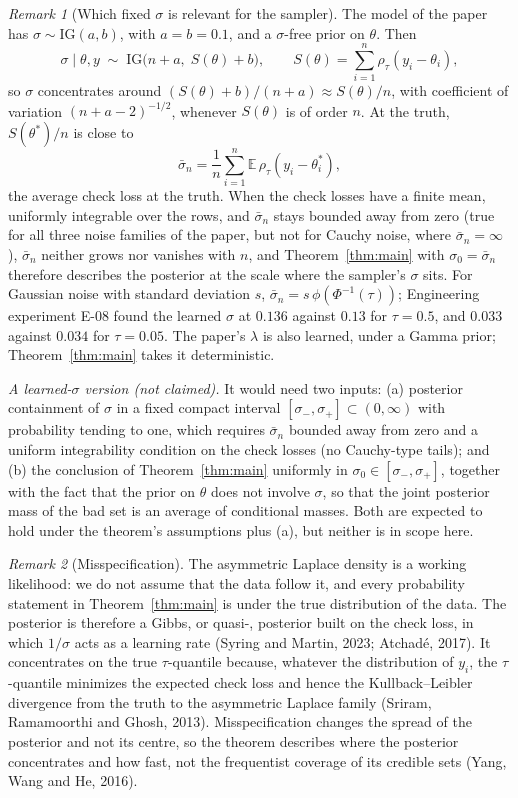 \documentclass[11pt]{article}
\theoremstyle{definition}
\theoremstyle{remark}
\newtheorem{remark}{Remark}
\newcommand{\E}{\mathbb{E}}
\newcommand{\thetas}{\theta^{*}}
\begin{document}
\begin{remark}[Which fixed $\sigma$ is relevant for the sampler]\label{rem:sampler}
The model of the paper has $\sigma\sim\mathrm{IG}(a,b)$, with $a=b=0.1$, and a $\sigma$-free prior on $\theta$. Then
\[
\sigma\mid\theta,y\;\sim\;\mathrm{IG}\bigl(n+a,\;S(\theta)+b\bigr),\qquad S(\theta)=\sum_{i=1}^n\rho_\tau(y_i-\theta_i),
\]
so $\sigma$ concentrates around $(S(\theta)+b)/(n+a)\approx S(\theta)/n$, with coefficient of variation $(n+a-2)^{-1/2}$, whenever $S(\theta)$ is of order $n$. At the truth, $S(\thetas)/n$ is close to
\[
\bar\sigma_n=\frac1n\sum_{i=1}^n\E\,\rho_\tau(y_i-\thetas_i),
\]
the average check loss at the truth. When the check losses have a finite mean, uniformly integrable over the rows, and $\bar\sigma_n$ stays bounded away from zero (true for all three noise families of the paper, but not for Cauchy noise, where $\bar\sigma_n=\infty$), $\bar\sigma_n$ neither grows nor vanishes with $n$, and Theorem~\ref{thm:main} with $\sigma_0=\bar\sigma_n$ therefore describes the posterior at the scale where the sampler's $\sigma$ sits. For Gaussian noise with standard deviation $s$, $\bar\sigma_n=s\,\phi(\Phi^{-1}(\tau))$; Engineering experiment E-08 found the learned $\sigma$ at $0.136$ against $0.13$ for $\tau=0.5$, and $0.033$ against $0.034$ for $\tau=0.05$. The paper's $\lambda$ is also learned, under a Gamma prior; Theorem~\ref{thm:main} takes it deterministic.

\emph{A learned-$\sigma$ version (not claimed).} It would need two inputs: (a) posterior containment of $\sigma$ in a fixed compact interval $[\sigma_-,\sigma_+]\subset(0,\infty)$ with probability tending to one, which requires $\bar\sigma_n$ bounded away from zero and a uniform integrability condition on the check losses (no Cauchy-type tails); and (b) the conclusion of Theorem~\ref{thm:main} uniformly in $\sigma_0\in[\sigma_-,\sigma_+]$, together with the fact that the prior on $\theta$ does not involve $\sigma$, so that the joint posterior mass of the bad set is an average of conditional masses. Both are expected to hold under the theorem's assumptions plus (a), but neither is in scope here.
\end{remark}

\begin{remark}[Misspecification]\label{rem:misspec}
The asymmetric Laplace density is a working likelihood: we do not assume that the data follow it, and every probability statement in Theorem~\ref{thm:main} is under the true distribution of the data. The posterior is therefore a Gibbs, or quasi-, posterior built on the check loss, in which $1/\sigma$ acts as a learning rate (Syring and Martin, 2023; Atchad\'e, 2017). It concentrates on the true $\tau$-quantile because, whatever the distribution of $y_i$, the $\tau$-quantile minimizes the expected check loss and hence the Kullback--Leibler divergence from the truth to the asymmetric Laplace family (Sriram, Ramamoorthi and Ghosh, 2013). Misspecification changes the spread of the posterior and not its centre, so the theorem describes where the posterior concentrates and how fast, not the frequentist coverage of its credible sets (Yang, Wang and He, 2016).
\end{remark}
\end{document}
